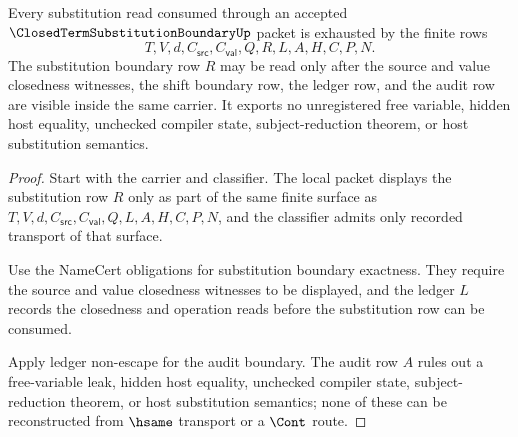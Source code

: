 \begin{theorem}
\label{thm:closed-term-substitution-boundary-substitution-ledger-exhaustion}
Every substitution read consumed through an accepted $\ClosedTermSubstitutionBoundaryUp$ packet is exhausted by the finite rows
$$
T,V,d,C_{\mathsf{src}},C_{\mathsf{val}},Q,R,L,A,H,C,P,N.
$$
The substitution boundary row $R$ may be read only after the source and value closedness witnesses, the shift boundary row, the ledger row, and the audit row are visible inside the same carrier. It exports no unregistered free variable, hidden host equality, unchecked compiler state, subject-reduction theorem, or host substitution semantics.
\end{theorem}
\begin{proof}
Start with the carrier and classifier. The local packet displays the substitution row $R$ only as part of the same finite surface as $T,V,d,C_{\mathsf{src}},C_{\mathsf{val}},Q,L,A,H,C,P,N$, and the classifier admits only recorded transport of that surface.

Use the NameCert obligations for substitution boundary exactness. They require the source and value closedness witnesses to be displayed, and the ledger $L$ records the closedness and operation reads before the substitution row can be consumed.

Apply ledger non-escape for the audit boundary. The audit row $A$ rules out a free-variable leak, hidden host equality, unchecked compiler state, subject-reduction theorem, or host substitution semantics; none of these can be reconstructed from $\hsame$ transport or a $\Cont$ route.
\end{proof}

